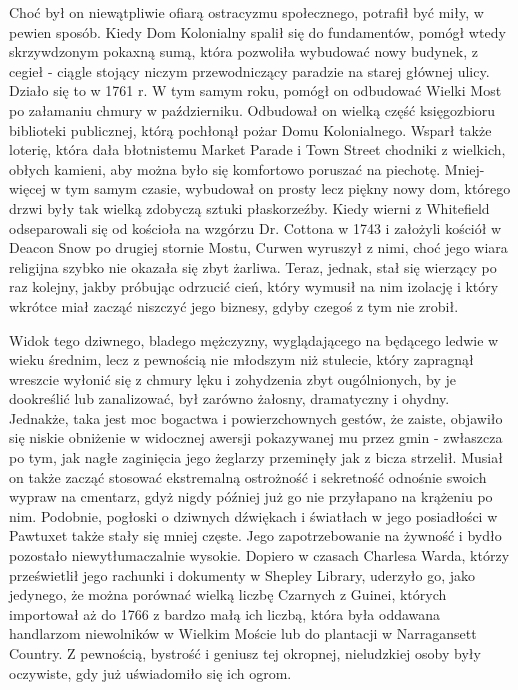 Choć był on niewątpliwie ofiarą ostracyzmu społecznego, potrafił być miły, w pewien sposób. Kiedy Dom Kolonialny spalił się do fundamentów, pomógł wtedy skrzywdzonym pokaxną sumą, która pozwoliła wybudować nowy budynek, z cegieł - ciągle stojący niczym przewodniczący paradzie na starej głównej ulicy. Działo się to w 1761 r. W tym samym roku, pomógł on odbudować Wielki Most po załamaniu chmury w październiku. Odbudował on wielką część księgozbioru biblioteki publicznej, którą pochłonął pożar Domu Kolonialnego. Wsparł także loterię, która dała błotnistemu Market Parade i Town Street chodniki z wielkich, obłych kamieni, aby można było się komfortowo poruszać na piechotę. Mniej-więcej w tym samym czasie, wybudował on prosty lecz piękny nowy dom, którego drzwi były tak wielką zdobyczą sztuki płaskorzeźby. Kiedy wierni z Whitefield odseparowali się od kościoła na wzgórzu Dr. Cottona w 1743 i założyli kościół w Deacon Snow po drugiej stornie Mostu, Curwen wyruszył z nimi, choć jego wiara religijna szybko nie okazała się zbyt żarliwa. Teraz, jednak, stał się wierzący po raz kolejny, jakby próbując odrzucić cień, który wymusił na nim izolację i który wkrótce miał zacząć niszczyć jego biznesy, gdyby czegoś z tym nie zrobił. 

Widok tego dziwnego, bladego mężczyzny, wyglądającego na będącego ledwie w wieku średnim, lecz z pewnością nie młodszym niż stulecie, który zapragnął wreszcie wyłonić się z chmury lęku i zohydzenia zbyt ougólnionych, by je dookreślić lub zanalizować, był zarówno żałosny, dramatyczny i ohydny. Jednakże, taka jest moc bogactwa i powierzchownych gestów, że zaiste, objawiło się niskie obniżenie w widocznej awersji pokazywanej mu przez gmin - zwłaszcza po tym, jak nagłe zaginięcia jego żeglarzy przeminęły jak z bicza strzelił. Musiał on także zacząć stosować ekstremalną ostrożność i sekretność odnośnie swoich wypraw na cmentarz, gdyż nigdy później już go nie przyłapano na krążeniu po nim. Podobnie, pogłoski o dziwnych dźwiękach i światłach w jego posiadłości w Pawtuxet także stały się mniej częste. Jego zapotrzebowanie na żywność i bydło pozostało niewytłumaczalnie wysokie. Dopiero w czasach Charlesa Warda, którzy prześwietlił jego rachunki i dokumenty w Shepley Library, uderzyło go, jako jedynego, że można porównać wielką liczbę Czarnych z Guinei, których importował aż do 1766 z bardzo małą ich liczbą, która była oddawana handlarzom niewolników w Wielkim Moście lub do plantacji w Narragansett Country. Z pewnością, bystrość i geniusz tej okropnej, nieludzkiej osoby były oczywiste, gdy już uświadomiło się ich ogrom.

